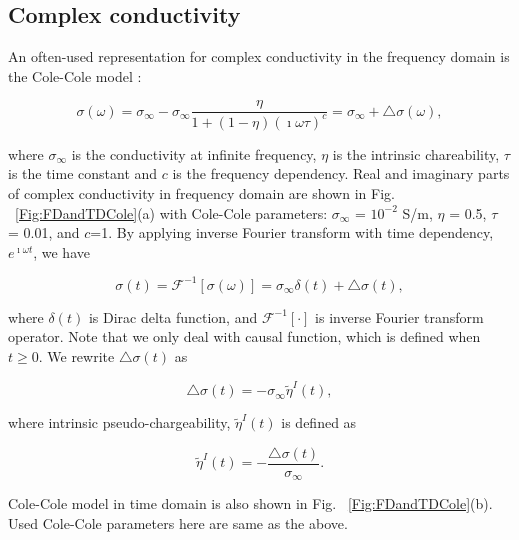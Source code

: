 \documentclass[letterpaper,11pt]{article}
\newcommand{\siginf}{\sigma_\infty}
\newcommand{\dsig}{\triangle\sigma}
\newcommand{\peta}{\tilde{\eta}}
\begin{document}
\subsection{Complex conductivity}
An often-used representation for complex conductivity in the frequency domain is the Cole-Cole model \cite[]{COLE}:
\begin{linenomath*}
\begin{equation}
  \sigma(\omega) = \sigma_{\infty} - \sigma_{\infty}\frac{\eta}{1+(1-\eta)(\imath\omega\tau)^c} = \sigma_{\infty} + \triangle\sigma(\omega),
  \label{eq: sigma_freq}
\end{equation}
\end{linenomath*}
where $\sigma_{\infty}$ is the conductivity at infinite frequency, $\eta$ is the intrinsic chareability, $\tau$ is the time constant and $c$ is the frequency dependency. Real and imaginary parts of complex conductivity in frequency domain are shown in Fig. ~\ref{Fig:FDandTDCole}(a) with Cole-Cole parameters: $\siginf$ = $10^{-2}$ S/m, $\eta $ = 0.5, $\tau$ = 0.01, and $c$=1. By applying inverse Fourier transform with time dependency, $e^{\imath\omega t}$, we have
\begin{linenomath*}
\begin{equation}
  \sigma(t) = \mathscr{F}^{-1}[\sigma(\omega)] = \sigma_{\infty}\delta(t) + \triangle\sigma(t),
  \label{eq: sigma_time}
\end{equation}
\end{linenomath*}
where $\delta(t)$ is Dirac delta function, and $\mathscr{F}^{-1}[\cdot]$ is inverse Fourier transform operator. Note that we only deal with causal function, which is defined when $t\ge 0$. 
We rewrite $\dsig(t)$ as 
\begin{linenomath*}
\begin{equation}
  \dsig(t) = - \siginf\peta^{I}(t),
  \label{eq: sigma_time_c1}
\end{equation}
\end{linenomath*}
where intrinsic pseudo-chargeability, $\peta^{I}(t)$ is defined as
\begin{linenomath*}
\begin{equation}
    \peta^{I}(t) = -\frac{\dsig(t)}{\siginf}. %
    \label{eq: intrinsic_peta}
\end{equation}
\end{linenomath*}
Cole-Cole model in time domain is also shown in Fig. ~\ref{Fig:FDandTDCole}(b). Used Cole-Cole parameters here are same as the above.
\end{document}
